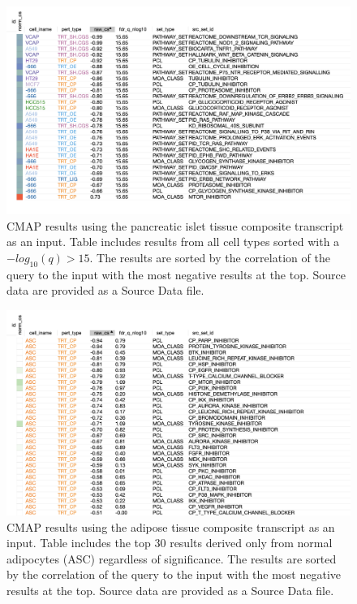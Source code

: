 \documentclass[
]{article}
\begin{document}
\begin{figure}[ht!]
\includegraphics[width=\textwidth]{Figures/Supp_Fig_Islet_all_cell_types.png} 
\caption{CMAP results using the pancreatic islet tissue composite transcript 
as an input. Table includes results from all cell types sorted with a 
$-log_{10}(q) > 15$. The results are sorted by the correlation of the 
query to the input with the most negative results at the top. Source data 
are provided as a Source Data file.
}
\label{fig:clue_islet_all}
\end{figure}

\begin{figure}[ht!]
\includegraphics[width=\textwidth]{Figures/Supp_Fig_Adipose_ASC.png} 
\caption{CMAP results using the adipose tissue composite 
transcript as an input. Table includes the top 30 results derived
only from normal adipocytes (ASC) regardless of significance. 
The results are sorted by the correlation of the query to the input 
with the most negative results at the top. Source data are provided 
as a Source Data file.
}
\label{fig:clue_adipose_asc}
\end{figure}
\end{document}
